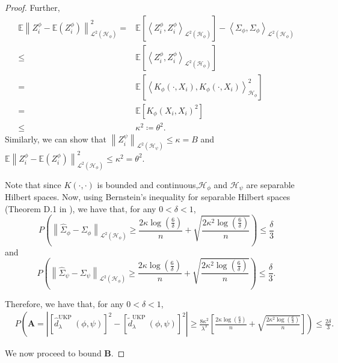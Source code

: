 \documentclass{article}
\theoremstyle{plain}
\newcommand{\E}{\mathbb{E}}
\newcommand{\HS}{\mathcal{L}^{2}}
\newcommand{\repone}{\phi}
\newcommand{\reptwo}{\psi}
\newcommand{\Hone}{\mathcal{H}_{\phi}}
\newcommand{\Htwo}{\mathcal{H}_{\psi}}
\newcommand{\norm}[1]{\left\|#1\right\|}
\newcommand{\inprod}[1]{\left \langle #1 \right\rangle}
\newcommand{\metricstname}{UKP }
\begin{document}
\begin{proof}
Further, 
\[
\begin{aligned}
   \E\norm{Z_{i}^{\repone}-\E(Z_{i}^{\repone})}_{\HS(\Hone)}^{2}
   =&\E\left[\inprod{Z_{i}^{\repone},Z_{i}^{\repone}}_{\HS(\Hone)}\right] - \inprod{\Sigma_{\repone},\Sigma_{\repone}}_{\HS(\Hone)}\\
   \leq& \E\left[\inprod{Z_{i}^{\repone},Z_{i}^{\repone}}_{\HS(\Hone)}\right]\\
   =&\E\left[\inprod{K_{\repone}(\cdot,X_{i}),K_{\repone}(\cdot,X_{i})}_{\Hone}^{2}\right]\\
   =&\E\left[K_{\repone}(X_{i},X_{i})^{2}\right]\\
   \leq& \kappa^{2} \coloneq \theta^{2}.
\end{aligned}
\]
Similarly, we can show that $\norm{Z_{i}^{\reptwo}}_{\HS(\Htwo)}\leq \kappa = B$ and $\E\norm{Z_{i}^{\repone}-\E(Z_{i}^{\repone})}_{\HS(\Hone)}^{2}\leq \kappa^{2} = \theta^{2}$.

Note that since $K(\cdot,\cdot)$ is bounded and continuous,$\Hone$ and $\Htwo$ are separable Hilbert spaces. Now, using Bernstein's inequality for separable Hilbert spaces (Theorem D.1 in \citet{sriperumbudur2022approximate}), we have that, for any $0<\delta<1$,
\[
P\left(\norm{\hat{\Sigma}_{\repone}-\Sigma_{\repone}}_{\HS(\Hone)} \geq \frac{2\kappa\log(\frac{6}{\delta})}{n} + \sqrt{\frac{2\kappa^{2}\log(\frac{6}{\delta})}{n}}\right) \leq \frac{\delta}{3}
\]
and 
\[
P\left(\norm{\hat{\Sigma}_{\reptwo}-\Sigma_{\reptwo}}_{\HS(\Hone)} \geq \frac{2\kappa\log(\frac{6}{\delta})}{n} + \sqrt{\frac{2\kappa^{2}\log(\frac{6}{\delta})}{n}}\right) \leq \frac{\delta}{3}.
\]

Therefore, we have that, for any $0<\delta<1$,
\[
\begin{aligned}
    &P\left(\mathbf{A}=\left|\left[\hat{d}_{\lambda}^{\text{\metricstname}}(\repone,\reptwo)\right]^{2} - \left[\tilde{d}_{\lambda}^{\text{\metricstname}}(\repone,\reptwo)\right]^{2}\right|\right.\geq \left.\frac{8\kappa^{2}}{\lambda^{3}}\left[\frac{2\kappa\log(\frac{6}{\delta})}{n} + \sqrt{\frac{2\kappa^{2}\log(\frac{6}{\delta})}{n}}\right]\right) \leq \frac{2\delta}{3}.
\end{aligned}
\]

We now proceed to bound $\mathbf{B}$.


\end{proof}
\end{document}
